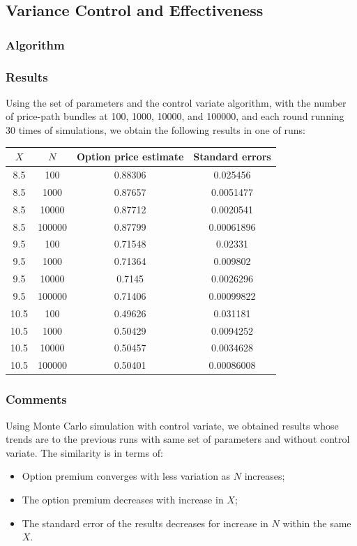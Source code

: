 \subsection{Variance Control and Effectiveness}
\subsubsection{Algorithm}

\subsubsection{Results}
Using the set of parameters and the control variate algorithm, with the number of price-path bundles at 100, 1000, 10000, and 100000, and each round running 30 times of simulations, we obtain the following results in one of runs:

\begin{center}
	\begin{tabular}{| c | c | c | c |}
		\hline $X$ & $N$ & Option price estimate & Standard errors\\
		[0.5ex]
		\hline 8.5 & 100 & 0.88306 & 0.025456\\
		\hline 8.5 & 1000 & 0.87657 & 0.0051477\\
		\hline 8.5 & 10000 & 0.87712 & 0.0020541\\
		\hline 8.5 & 100000 & 0.87799 & 0.00061896\\
		\hline
		\hline 9.5 & 100 & 0.71548 & 0.02331\\
		\hline 9.5 & 1000 & 0.71364 & 0.009802\\
		\hline 9.5 & 10000 & 0.7145 & 0.0026296\\
		\hline 9.5 & 100000 & 0.71406 & 0.00099822\\
		\hline
		\hline 10.5 & 100 & 0.49626 & 0.031181\\
		\hline 10.5 & 1000 & 0.50429 & 0.0094252\\
		\hline 10.5 & 10000 & 0.50457 & 0.0034628\\
		\hline 10.5 & 100000 & 0.50401 & 0.00086008\\
		\hline
	\end{tabular}
\end{center}

\subsubsection{Comments}
Using Monte Carlo simulation with control variate, we obtained results whose trends are to the previous runs with same set of parameters and without control variate. The similarity is in terms of:
\begin{itemize}
	\item Option premium converges with less variation as $N$ increases;
	\item The option premium decreases with increase in $X$; 
	\item The standard error of the results decreases for increase in $N$ within the same $X$. 
\end{itemize}

